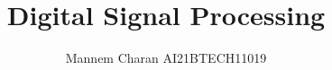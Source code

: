 \documentclass[journal,12pt,twocolumn]{IEEEtran}
\begin{document}

\def\putbox#1#2#3{\makebox[0in][l]{\makebox[#1][l]{}\raisebox{\baselineskip}[0in][0in]{\raisebox{#2}[0in][0in]{#3}}}}
     \def\rightbox#1{\makebox[0in][r]{#1}}
     \def\centbox#1{\makebox[0in]{#1}}
     \def\topbox#1{\raisebox{-\baselineskip}[0in][0in]{#1}}
     \def\midbox#1{\raisebox{-0.5\baselineskip}[0in][0in]{#1}}

\vspace{3cm}

\title{ 
Digital Signal Processing
}


%
%
%

\author{ Mannem Charan AI21BTECH11019}
% 
%
\end{document}
